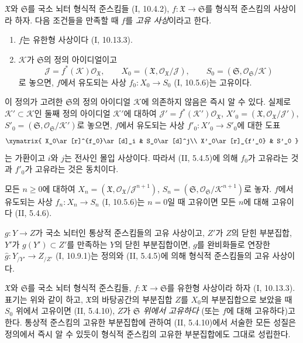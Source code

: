 \begin{env}[3.4.1]
\label{III.3.4.1-fr}
$\mathfrak X$와 $\mathfrak S$를 국소 뇌터 형식적 준스킴들
(I, 10.4.2), $f:\mathfrak X\to\mathfrak S$를 형식적 준스킴의 사상이라
하자. 다음 조건들을 만족할 때 $f$를 \emph{고유 사상}이라고 한다.
\begin{enumerate}
\item[$1^\circ$] $f$는 유한형 사상이다 (I, 10.13.3).
\item[$2^\circ$] $\mathcal K$가 $\mathfrak S$의 정의 아이디얼이고
\[
\mathcal J=f^*(\mathcal K)\mathcal O_{\mathfrak X},\qquad
X_0=(\mathfrak X,\mathcal O_{\mathfrak X}/\mathcal J),\qquad
S_0=(\mathfrak S,\mathcal O_{\mathfrak S}/\mathcal K)
\]
로 놓으면, $f$에서 유도되는 사상 $f_0:X_0\to S_0$ (I, 10.5.6)는
고유이다.
\end{enumerate}

이 정의가 고려한 $\mathfrak S$의 정의 아이디얼 $\mathcal K$에 의존하지
않음은 즉시 알 수 있다. 실제로 $\mathcal K'\subset\mathcal K$인 둘째
정의 아이디얼 $\mathcal K'$에 대하여
$\mathcal J'=f^*(\mathcal K')\mathcal O_{\mathfrak X}$,
$X'_0=(\mathfrak X,\mathcal O_{\mathfrak X}/\mathcal J')$,
$S'_0=(\mathfrak S,\mathcal O_{\mathfrak S}/\mathcal K')$로 놓으면,
$f$에서 유도되는 사상 $f'_0:X'_0\to S'_0$에 대한 도표
\[
\xymatrix{
X_0\ar[r]^{f_0}\ar[d]_i & S_0\ar[d]^j\\
X'_0\ar[r]_{f'_0} & S'_0
}
\]
는 가환이고 $i$와 $j$는 전사인 몰입 사상이다. 따라서 (II, 5.4.5)에
의해 $f_0$가 고유라는 것과 $f'_0$가 고유라는 것은 동치이다.

모든 $n\geq0$에 대하여
$X_n=(\mathfrak X,\mathcal O_{\mathfrak X}/\mathcal J^{n+1})$,
$S_n=(\mathfrak S,\mathcal O_{\mathfrak S}/\mathcal K^{n+1})$로 놓자.
$f$에서 유도되는 사상 $f_n:X_n\to S_n$ (I, 10.5.6)는 $n=0$일 때
고유이면 모든 $n$에 대해 고유이다 (II, 5.4.6).

$g:Y\to Z$가 국소 뇌터인 통상적 준스킴들의 고유 사상이고, $Z'$가
$Z$의 닫힌 부분집합, $Y'$가 $g(Y')\subset Z'$를 만족하는 $Y$의 닫힌
부분집합이면, $g$를 완비화들로 연장한
$\widehat g:Y_{/Y'}\to Z_{/Z'}$ (I, 10.9.1)는 정의와 (II, 5.4.5)에
의해 형식적 준스킴들의 고유 사상이다.

$\mathfrak X$와 $\mathfrak S$를 국소 뇌터 형식적 준스킴들,
$f:\mathfrak X\to\mathfrak S$를 유한형 사상이라 하자 (I, 10.13.3).
표기는 위와 같이 하고, $\mathfrak X$의 바탕공간의 부분집합 $Z$를
$X_0$의 부분집합으로 보았을 때 $S_0$ 위에서 고유이면
(II, 5.4.10), $Z$가 \emph{$\mathfrak S$ 위에서 고유하다} (또는
$f$에 대해 고유하다)고 한다. 통상적 준스킴의 고유한 부분집합에 관하여
(II, 5.4.10)에서 서술한 모든 성질은 정의에서 즉시 알 수 있듯이 형식적
준스킴의 고유한 부분집합에도 그대로 성립한다.
\end{env}

